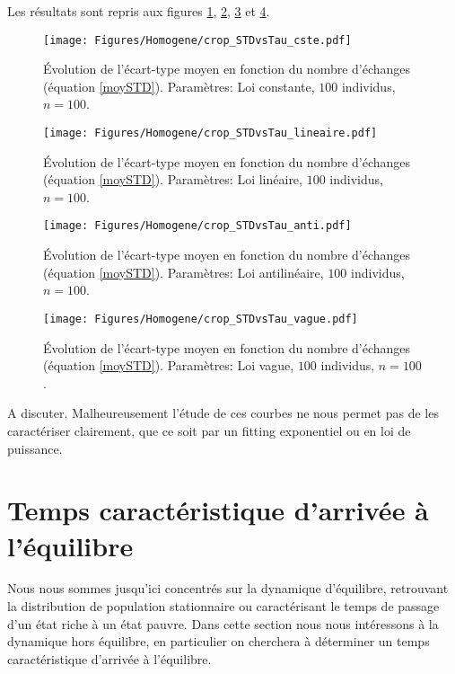 Les résultats sont repris aux figures \ref{ergo_cste_STD}, \ref{ergo_lineaire_STD}, \ref{ergo_anti_STD} et \ref{ergo_vague_STD}.

\begin{figure}[h]
\centering
\texttt{[image: Figures/Homogene/crop\_STDvsTau\_cste.pdf]}
\caption{Évolution de l'écart-type moyen en fonction du nombre d'échanges (équation \ref{moySTD}). Paramètres: Loi constante, $100$ individus, $n=100$.}
\label{ergo_cste_STD}
\end{figure}

\begin{figure}[h]
\centering
\texttt{[image: Figures/Homogene/crop\_STDvsTau\_lineaire.pdf]}
\caption{Évolution de l'écart-type moyen en fonction du nombre d'échanges (équation \ref{moySTD}). Paramètres: Loi linéaire, $100$ individus, $n=100$.}
\label{ergo_lineaire_STD}
\end{figure}

\begin{figure}[h]
\centering
\texttt{[image: Figures/Homogene/crop\_STDvsTau\_anti.pdf]}
\caption{Évolution de l'écart-type moyen en fonction du nombre d'échanges (équation \ref{moySTD}). Paramètres: Loi antilinéaire, $100$ individus, $n=100$.}
\label{ergo_anti_STD}
\end{figure}

\begin{figure}[h]
\centering
\texttt{[image: Figures/Homogene/crop\_STDvsTau\_vague.pdf]}
\caption{Évolution de l'écart-type moyen en fonction du nombre d'échanges (équation \ref{moySTD}). Paramètres: Loi vague, $100$ individus, $n=100$.}
\label{ergo_vague_STD}
\end{figure}

A discuter. \fixme 
Malheureusement l'étude de ces courbes ne nous permet pas de les caractériser clairement, que ce soit par un fitting exponentiel ou en loi de puissance.


\section{Temps caractéristique d'arrivée à l'équilibre}

Nous nous sommes jusqu'ici concentrés sur la dynamique d'équilibre, retrouvant la distribution de population stationnaire ou caractérisant le temps de passage d'un état riche à un état pauvre. Dans cette section nous nous intéressons à la dynamique hors équilibre, en particulier on cherchera à déterminer un temps caractéristique d'arrivée à l'équilibre.\\

